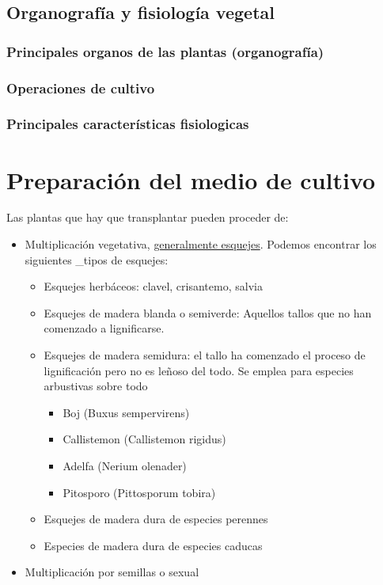 \documentclass[a4paper,12pt,oneside]{book}
\begin{document}
\section{Organografía y fisiología vegetal}
\label{sec:org112b6a0}
\subsection{Principales organos de las plantas (organografía)}
\label{sec:org925efae}
\subsection{Operaciones de cultivo}
\label{sec:orga898aa8}
\subsection{Principales características fisiologicas}
\label{sec:orge936ade}
\chapter{Preparación del medio de cultivo}
\label{sec:org7b0fee1}
Las plantas que hay que transplantar pueden proceder de:
\begin{itemize}
\item Multiplicación vegetativa, \uline{generalmente esquejes}. Podemos encontrar los
siguientes \_tipos de esquejes:
\begin{itemize}
\item Esquejes herbáceos: clavel, crisantemo, salvia
\item Esquejes de madera blanda o semiverde: Aquellos tallos que no han comenzado
a lignificarse.
\item Esquejes de madera semidura: el tallo ha comenzado el proceso de
lignificación pero no es leñoso del todo. Se emplea para especies arbustivas
sobre todo
\begin{itemize}
\item Boj (Buxus sempervirens)
\item Callistemon (Callistemon rigidus)
\item Adelfa (Nerium olenader)
\item Pitosporo (Pittosporum tobira)
\end{itemize}
\item Esquejes de madera dura de especies perennes
\item Especies de madera dura de especies caducas
\end{itemize}
\item Multiplicación por semillas o sexual
\end{itemize}
\end{document}
